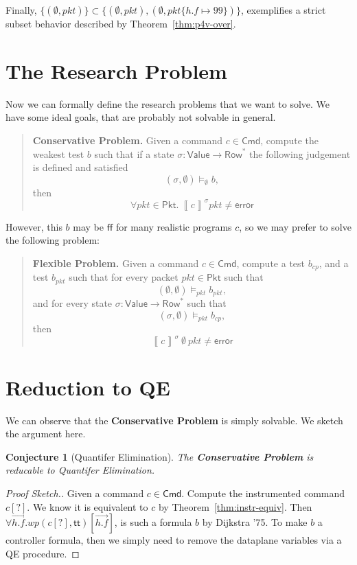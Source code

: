 \documentclass{article}
\newcommand{\pkt}{\mathit{pkt}}
\newcommand{\error}{\mathsf{error}}
\newcommand{\denote}[1]{\left\llbracket#1\right\rrbracket}
\newcommand{\TRUE}{\mathsf{tt}}
\newcommand{\FALSE}{\mathsf{ff}}
\newcommand{\Value}{\mathsf{Value}}
\newcommand{\Cmd}{\mathsf{Cmd}}
\newcommand{\Pkt}{\mathsf{Pkt}}
\newcommand{\Row}{\mathsf{Row}}
\newcommand{\WP}{\textit{wp}}
\newcommand{\satisfy}[3]{({#1,#3}) \models_{#2}}
\newtheorem{conjecture}{Conjecture}
\begin{document}
Finally, $\{(\emptyset,\pkt)\} \subset
\{(\emptyset,\pkt),(\emptyset,\pkt\{h.f\mapsto 99\})\}$, exemplifies a strict
subset behavior described by Theorem~\ref{thm:p4v-over}.


\section{The Research Problem}

Now we can formally define the research problems that we want to solve. We have
some ideal goals, that are probably not solvable in general.

\begin{quote}
  \textbf{Conservative Problem.} Given a command $c \in \Cmd$, compute the weakest test
  $b$ such that if a state $\sigma : \Value \to \Row^*$ the following
  judgement is defined and satisfied \[\satisfy\sigma\emptyset\emptyset b,\] then \[\forall \pkt \in \Pkt.~
  \denote{c}^\sigma \pkt \neq \error \]
\end{quote}

However, this $b$ may be $\FALSE$ for many realistic programs $c$, so we may
prefer to solve the following problem:

\begin{quote}
  \textbf{Flexible Problem.} Given a command $c \in \Cmd$, compute a test
  $b_{\mathit{cp}}$, and a test $b_{\mathit{pkt}}$ such that
  for every packet $\pkt \in \Pkt$ such that
  \[\satisfy \emptyset \pkt \emptyset b_{\mathit{pkt}},\]
  and for every state $\sigma : \Value \to \Row^*$ such that
  \[\satisfy \sigma \pkt \emptyset b_{\mathit{cp}},\]
  then \[\denote{c}^\sigma ~\emptyset~\pkt \neq \error \]
\end{quote}



\section{Reduction to QE}

We can observe that the \textbf{Conservative Problem} is simply solvable. We
sketch the argument here.

\begin{conjecture}[Quantifer Elimination]
  The \textbf{\textrm{Conservative Problem}} is reducable to Quantifer Elimination.
\end{conjecture}

\begin{proof}[Proof Sketch.]
  Given a command $c \in \Cmd$. Compute the instrumented command $c[?]$. We know
  it is equivalent to $c$ by Theorem~\ref{thm:instr-equiv}. Then $\forall
  \overrightarrow{h.f}.\WP(c[?],\TRUE)[\overrightarrow{h.f}]$, is such a
  formula $b$ by Dijkstra '75. To make $b$ a controller formula, then we simply
  need to remove the dataplane variables via a QE procedure.
\end{proof}
\end{document}
